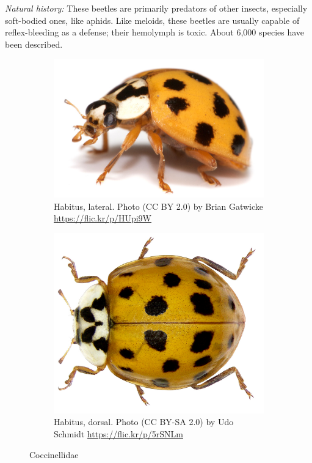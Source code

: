 \documentclass[letterpaper, 11pt]{article}
\begin{document}
\noindent{}\textit{Natural history:} These beetles are primarily predators of other insects, especially soft-bodied ones, like aphids. Like meloids, these beetles are usually capable of reflex-bleeding as a defense; their hemolymph is toxic. About 6,000 species have been described.

\begin{figure}[ht!]
  \centering
\begin{subfigure}[ht!]{0.42\textwidth}
    \includegraphics[width=\textwidth]{CoccinellidLateral}
  \caption{Habitus, lateral. Photo (CC BY 2.0) by Brian Gatwicke \url{https://flic.kr/p/HUpi9W}}
  \label{fig:coccinellid1}
\end{subfigure}
    \qquad
\begin{subfigure}[ht!]{0.42\textwidth}
    \includegraphics[width=\textwidth]{CoccinellidHabitus}
  \caption{Habitus, dorsal. Photo (CC BY-SA 2.0) by Udo Schmidt \url{https://flic.kr/p/5rSNLm}}
  \label{fig:coccinellid2}
\end{subfigure}
    \caption{Coccinellidae}\label{fig:coccinellids}
\end{figure}
\end{document}

